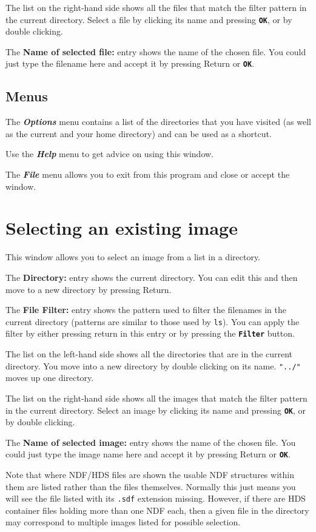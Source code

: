 \documentclass[11pt]{article}
\newcommand{\xlabel}[1]{}
\newcommand{\butt}[1]{{\bf \tt #1}}
\newcommand{\menu}[1]{{\bf \em #1}}
\newcommand{\wlab}[1]{{\bf #1}}
\newcommand{\text}[1]{{\tt #1}}
\begin{document}
The list on the right-hand side shows all the files that match the filter
pattern in the current directory. Select a file by clicking its name and
pressing \butt{OK}, or by double clicking.

The \wlab{Name of selected file:} entry shows the name of the chosen file.
You could just type the filename here and accept it by pressing Return or
\butt{OK}.

\subsection{Menus \xlabel{CCDGetFileNameMenu}}

The \menu{Options} menu contains a list of the directories that you
have visited (as well as the current and your home directory) and can
be used as a shortcut.

Use the \menu{Help} menu to get advice on using this window.

The \menu{File} menu allows you to exit from this program and close or
accept the window.

\section{Selecting an existing image \xlabel{CCDGetImageNameWindow}}
This window allows you to select an image from a list in a directory.

The \wlab{Directory:} entry shows the current directory. You can edit this
and then move to a new directory by pressing Return.

The \wlab{File Filter:} entry shows the pattern used to filter the
filenames in the current directory (patterns are similar to those used
by \text{ls}). You can apply the filter by either pressing return in
this entry or by pressing the \butt{Filter} button.

The list on the left-hand side shows all the directories that are in
the current directory. You move into a new directory by double
clicking on its name. \text{"../"} moves up one directory.

The list on the right-hand side shows all the images that match the filter
pattern in the current directory. Select an image by clicking its name and
pressing \butt{OK}, or by double clicking.

The \wlab{Name of selected image:} entry shows the name of the chosen file.
You could just type the image name here and accept it by pressing Return or
\butt{OK}.

Note that where NDF/HDS files are shown the usable NDF structures
within them are listed rather than the files themselves.
Normally this just means you will see the file listed
with its \text{.sdf} extension missing.  However, if there are HDS
container files holding more than one NDF each, then a given
file in the directory may correspond to multiple images listed
for possible selection.
\end{document}
